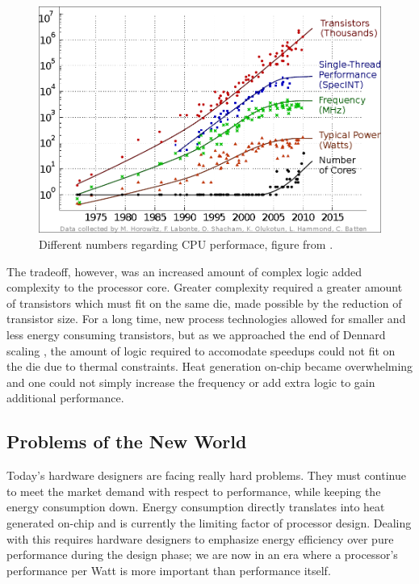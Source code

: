 \begin{figure}
\includegraphics[width=\textwidth]{figs/cpu-performance.png}
\caption{Different numbers regarding CPU performace, figure from \cite{salishan2011}.}
\label{fig:cpuperformance}
\end{figure}


The tradeoff, however, was an increased amount of complex logic added complexity
to the processor core. Greater complexity required a greater amount of
transistors which must fit on the same die, made possible by the reduction of
transistor size. For a long time, new process technologies allowed for smaller
and less energy consuming transistors, but as we approached the end of Dennard
scaling \cite{dennard}, the amount of logic required to accomodate speedups
could not fit on the die due to thermal constraints. Heat generation on-chip
became overwhelming and one could not simply increase the frequency or add
extra logic to gain additional performance.


\subsection{Problems of the New World}

Today's hardware designers are facing really hard problems. They must continue
to meet the market demand with respect to performance, while keeping the energy
consumption down. Energy consumption directly translates into heat generated
on-chip and is currently the limiting factor of processor design. Dealing with
this requires hardware designers to emphasize energy efficiency over pure
performance during the design phase; we are now in an era where a processor's
performance per Watt is more important than performance itself.


